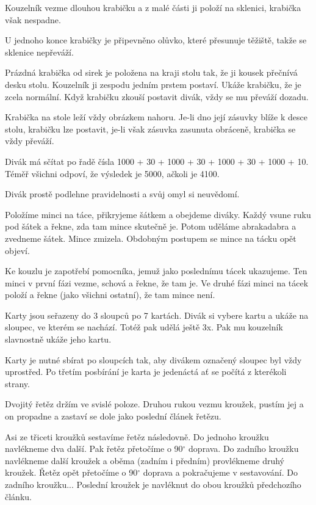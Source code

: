 Kouzelník vezme dlouhou krabičku a z malé části ji položí 
na sklenici, krabička však nespadne.

U jednoho konce krabičky je připevněno olůvko, které přesunuje 
těžiště, takže se sklenice nepřeváží.


Prázdná krabička od sirek je položena na kraji stolu 
tak, že ji kousek přečnívá desku stolu. Kouzelník ji zespodu 
jedním prstem postaví. Ukáže krabičku, že je zcela normální. 
Když krabičku zkouší postavit divák, vždy se mu převáží dozadu.

Krabička na stole leží vždy obrázkem nahoru. Je-li dno její 
zásuvky blíže k desce stolu, krabičku lze postavit, je-li však 
zásuvka zasunuta obráceně, krabička se vždy převáží.


Divák má sčítat po řadě čísla 1000 + 30 + 1000 + 30 + 
1000 + 30 + 1000 + 10. Téměř všichni odpoví, že výsledek je 5000, 
ačkoli je 4100.

Divák prostě podlehne pravidelnosti a svůj omyl si neuvědomí.


Položíme minci na táce, přikryjeme šátkem a obejdeme 
diváky. Každý vsune ruku pod šátek a řekne, zda tam mince skutečně 
je. Potom uděláme abrakadabra a zvedneme šátek. Mince zmizela. 
Obdobným postupem se mince na tácku opět objeví.

Ke kouzlu je zapotřebí pomocníka, jemuž jako poslednímu tácek 
ukazujeme. Ten minci v první fázi vezme, schová a řekne, že tam 
je. Ve druhé fázi minci na tácek položí a řekne (jako všichni 
ostatní), že tam mince není.


Karty jsou seřazeny do 3 sloupců po 7 kartách. Divák 
si vybere kartu a ukáže na sloupec, ve kterém se nachází. Totéž 
pak udělá ještě 3x. Pak mu kouzelník slavnostně ukáže jeho kartu.

Karty je nutné sbírat po sloupcích tak, aby divákem označený 
sloupec byl vždy uprostřed. Po třetím posbírání je karta je jedenáctá 
ať se počítá z kterékoli strany.


Dvojitý řetěz držím ve svislé poloze. Druhou rukou vezmu 
kroužek, pustím jej a on propadne a zastaví se dole jako poslední 
článek řetězu.

Asi ze třiceti kroužků sestavíme řetěz následovně. Do jednoho 
kroužku navlékneme dva další. Pak řetěz přetočíme o 90$^\circ$ 
doprava. Do zadního kroužku navlékneme další kroužek a oběma 
(zadním i předním) provlékneme druhý kroužek. Řetěz opět přetočíme 
o 90$^\circ$ doprava a pokračujeme v sestavování. Do zadního 
kroužku... Poslední kroužek je navléknut do obou kroužků předchozího 
článku.

